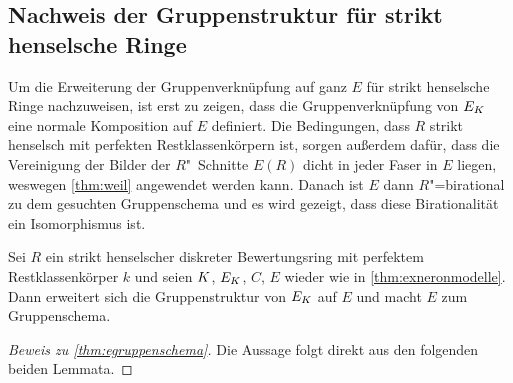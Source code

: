 \subsection{Nachweis der Gruppenstruktur für strikt henselsche Ringe}
Um die Erweiterung der Gruppenverknüpfung auf ganz $E$ für strikt
henselsche Ringe nachzuweisen, ist erst zu zeigen, dass die
Gruppenverknüpfung von $E_{K}$ eine normale Komposition auf $E$
definiert.
Die Bedingungen, dass $R$ strikt henselsch mit perfekten
Restklassenkörpern ist, sorgen außerdem dafür, dass die Vereinigung
der Bilder der $R$"~Schnit\-te $E(R)$ dicht in jeder Faser in $E$ liegen,
weswegen \ref{thm:weil} angewendet werden kann.
Danach ist $E$ dann $R$"=birational zu dem gesuchten
Gruppenschema und es wird gezeigt, dass diese Birationalität ein
Isomorphismus ist.
\begin{Satz}\label{thm:egruppenschema}
  Sei $R$ ein strikt henselscher diskreter Bewertungsring mit
  perfektem Restklassenkörper $k$ und seien $K$, $E_{K}$, $C$, $E$
  wieder wie in \ref{thm:exneronmodelle}.
  Dann erweitert sich die Gruppenstruktur von $E_{K}$ auf $E$ und macht
  $E$ zum Gruppenschema.
  \begin{proof}[Beweis zu \ref{thm:egruppenschema}]
    Die Aussage folgt direkt aus den folgenden beiden Lemmata.
  \end{proof}
\end{Satz}
